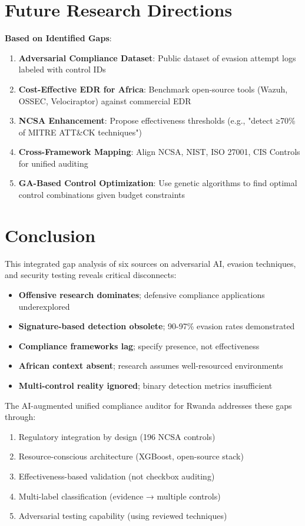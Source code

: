 \documentclass[11pt,conference]{IEEEtran}
\begin{document}
\section{Future Research Directions}

\textbf{Based on Identified Gaps}:
\begin{enumerate}
    \item \textbf{Adversarial Compliance Dataset}: Public dataset of evasion attempt logs labeled with control IDs
    \item \textbf{Cost-Effective EDR for Africa}: Benchmark open-source tools (Wazuh, OSSEC, Velociraptor) against commercial EDR
    \item \textbf{NCSA Enhancement}: Propose effectiveness thresholds (e.g., "detect ≥70\% of MITRE ATT\&CK techniques")
    \item \textbf{Cross-Framework Mapping}: Align NCSA, NIST, ISO 27001, CIS Controls for unified auditing
    \item \textbf{GA-Based Control Optimization}: Use genetic algorithms to find optimal control combinations given budget constraints
\end{enumerate}

\section{Conclusion}

This integrated gap analysis of six sources on adversarial AI, evasion techniques, and security testing reveals critical disconnects:

\begin{itemize}
    \item \textbf{Offensive research dominates}; defensive compliance applications underexplored
    \item \textbf{Signature-based detection obsolete}; 90-97\% evasion rates demonstrated
    \item \textbf{Compliance frameworks lag}; specify presence, not effectiveness
    \item \textbf{African context absent}; research assumes well-resourced environments
    \item \textbf{Multi-control reality ignored}; binary detection metrics insufficient
\end{itemize}

The AI-augmented unified compliance auditor for Rwanda addresses these gaps through:
\begin{enumerate}
    \item Regulatory integration by design (196 NCSA controls)
    \item Resource-conscious architecture (XGBoost, open-source stack)
    \item Effectiveness-based validation (not checkbox auditing)
    \item Multi-label classification (evidence → multiple controls)
    \item Adversarial testing capability (using reviewed techniques)
\end{enumerate}
\end{document}
